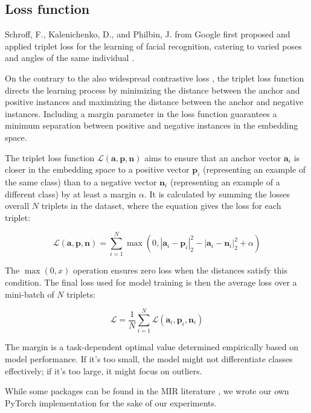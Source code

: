 \subsection{Loss function}

Schroff, F., Kalenichenko, D., and Philbin, J. from Google first proposed and applied triplet loss for the learning of facial recognition, catering to varied poses and angles of the same individual \cite{Schroff2015FaceNet:Clustering}.

On the contrary to the also widespread contrastive loss \cite{supercontrast}, the triplet loss function directs the learning process by minimizing the distance between the anchor and positive instances and maximizing the distance between the anchor and negative instances. Including a margin parameter in the loss function guarantees a minimum separation between positive and negative instances in the embedding space.

The triplet loss function $\mathcal{L}(\mathbf{a}, \mathbf{p}, \mathbf{n})$ aims to ensure that an anchor vector $\mathbf{a}_i$ is closer in the embedding space to a positive vector $\mathbf{p}_i$ (representing an example of the same class) than to a negative vector $\mathbf{n}_i$ (representing an example of a different class) by at least a margin $\alpha$. It is calculated by summing the losses overall $N$ triplets in the dataset, where the equation gives the loss for each triplet:

\begin{equation}
\mathcal{L}(\mathbf{a}, \mathbf{p}, \mathbf{n}) = \sum_{i=1}^{N} \max \left(0, \left| \mathbf{a}_i - \mathbf{p}_i \right|_2^2 - \left| \mathbf{a}_i - \mathbf{n}_i \right|_2^2 + \alpha \right)
\end{equation}

The $\max(0, x)$ operation ensures zero loss when the distances satisfy this condition. The final loss used for model training is then the average loss over a mini-batch of $N$ triplets:

\begin{equation}
\mathcal{L} = \frac{1}{N} \sum_{i=1}^{N} \mathcal{L}(\mathbf{a}_i, \mathbf{p}_i, \mathbf{n}_i)
\end{equation}

The margin is a task-dependent optimal value determined empirically based on model performance. If it's too small, the model might not differentiate classes effectively; if it's too large, it might focus on outliers.

While some packages can be found in the MIR literature \cite{auraloss}, we wrote our own PyTorch \cite{Paszke2019PyTorch:Library} implementation for the sake of our experiments.

